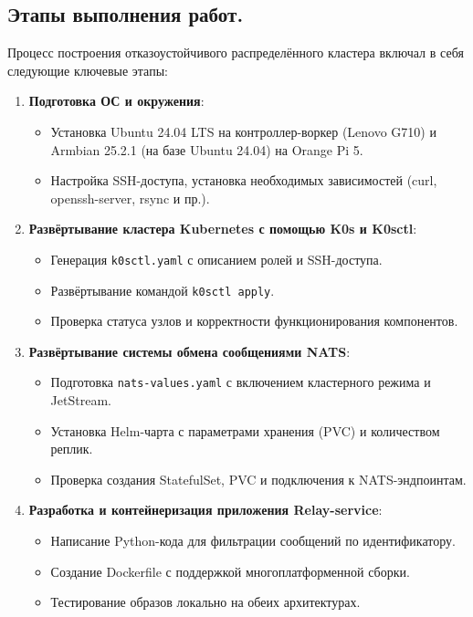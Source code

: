 \documentclass[14pt, a4paper]{extreport}
\begin{document}
\subsection{Этапы выполнения работ.}

Процесс построения отказоустойчивого распределённого кластера включал в себя следующие ключевые этапы:

\begin{enumerate}
\item \textbf{Подготовка ОС и окружения}:
\begin{itemize}
\item Установка Ubuntu 24.04 LTS на контроллер-воркер (Lenovo G710) и Armbian 25.2.1 (на базе Ubuntu 24.04) на Orange Pi 5.
\item Настройка SSH-доступа, установка необходимых зависимостей (curl, openssh-server, rsync и пр.).
\end{itemize}

\item \textbf{Развёртывание кластера Kubernetes с помощью K0s и K0sctl}:
\begin{itemize}
\item Генерация \texttt{k0sctl.yaml} с описанием ролей и SSH-доступа.
\item Развёртывание командой \texttt{k0sctl apply}.
\item Проверка статуса узлов и корректности функционирования компонентов.
\end{itemize}

\item \textbf{Развёртывание системы обмена сообщениями NATS}:
\begin{itemize}
\item Подготовка \texttt{nats-values.yaml} с включением кластерного режима и JetStream.
\item Установка Helm-чарта с параметрами хранения (PVC) и количеством реплик.
\item Проверка создания StatefulSet, PVC и подключения к NATS-эндпоинтам.
\end{itemize}

\item \textbf{Разработка и контейнеризация приложения Relay-service}:
\begin{itemize}
\item Написание Python-кода для фильтрации сообщений по идентификатору.
\item Создание Dockerfile с поддержкой многоплатформенной сборки.
\item Тестирование образов локально на обеих архитектурах.
\end{itemize}


\end{enumerate}
\end{document}
